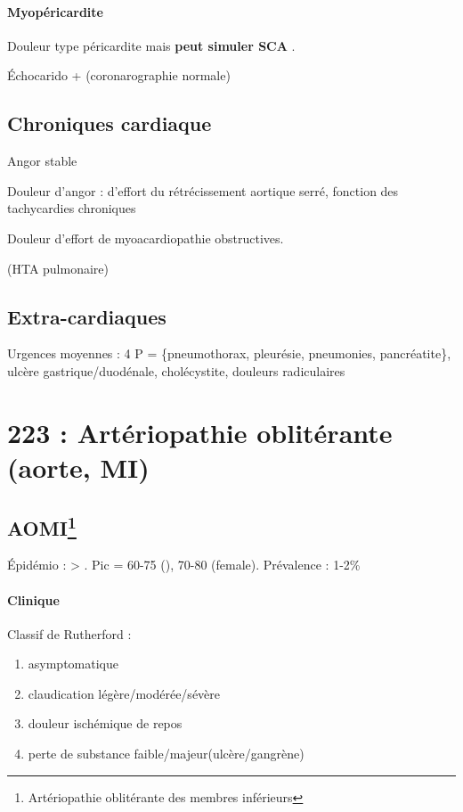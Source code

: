 \paragraph{Myopéricardite}
Douleur type péricardite mais \textbf{peut simuler SCA} .

Échocarido + (coronarographie normale)

\subsection{Chroniques cardiaque}
Angor stable

Douleur d'angor : d'effort du rétrécissement aortique serré, fonction des
tachycardies chroniques

Douleur d'effort de myoacardiopathie obstructives.

(HTA pulmonaire)

\subsection{Extra-cardiaques}
Urgences moyennes : 4 P = \{pneumothorax, pleurésie,
pneumonies, pancréatite\}, ulcère gastrique/duodénale, cholécystite, douleurs
radiculaires

\section{223 : Artériopathie oblitérante (aorte, MI)}%
\label{sec:223_arteriopathie_obliterante_aorte_mi_}
\subsection{AOMI\footnote{Artériopathie oblitérante des membres inférieurs}}

Épidémio : \male > \female. Pic = 60-75 (\male), 70-80 (female). Prévalence :
1-2\%

\paragraph{Clinique}
Classif de Rutherford : 
\begin{enumerate}[label=\Roman*]
  \item asymptomatique 
  \item claudication légère/modérée/sévère
  \item douleur ischémique de repos 
  \item perte de substance faible/majeur(ulcère/gangrène)
\end{enumerate}

